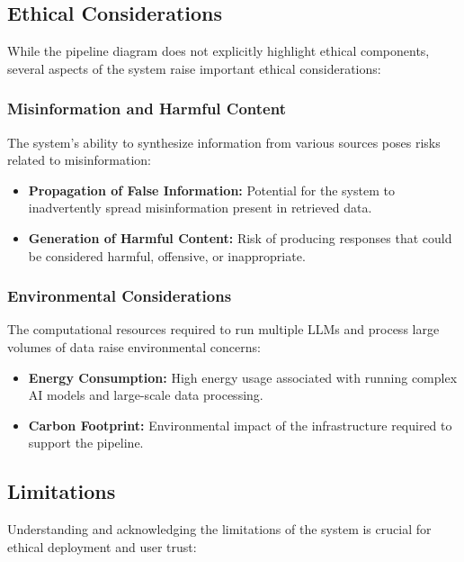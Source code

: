\subsection{Ethical Considerations}\label{subsec:ethical-considerations}
While the pipeline diagram does not explicitly highlight ethical components, several aspects of the system raise important ethical considerations:

\subsubsection{Misinformation and Harmful Content}\label{subsubsec:misinformation-and-harmful-content}
The system's ability to synthesize information from various sources poses risks related to misinformation:
\begin{itemize}
    \item \textbf{Propagation of False Information:} Potential for the system to inadvertently spread misinformation present in retrieved data.
    \item \textbf{Generation of Harmful Content:} Risk of producing responses that could be considered harmful, offensive, or inappropriate.
\end{itemize}

\subsubsection{Environmental Considerations}\label{subsubsec:environmental-considerations}
The computational resources required to run multiple LLMs and process large volumes of data raise environmental concerns:
\begin{itemize}
    \item \textbf{Energy Consumption:} High energy usage associated with running complex AI models and large-scale data processing.
    \item \textbf{Carbon Footprint:} Environmental impact of the infrastructure required to support the pipeline.
\end{itemize}

\subsection{Limitations}\label{subsec:limitations}
Understanding and acknowledging the limitations of the system is crucial for ethical deployment and user trust:

